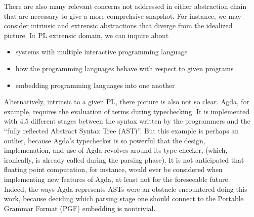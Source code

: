 There are also many relevant concerns not addressed in either abstraction chain
that are necessary to give a more comprehsive snapshot. For instance, we may
consider intrinsic and extrensic abstractions that diverge from the idealized
picture. In PL extrensic domain, we can inquire about 

\begin{itemize}

\item systems with multiple interactive programming language 
\item how the programming languages behave with respect to given programs
\item embedding programming languages into one another

\end{itemize}

Alternatively, intrinsic to a given PL, there picture is also not so clear.
Agda, for example, requires the evaluation of terms during typechecking. It is
implemented with 4.5 different stages between the syntax written by the
programmers and the ``fully reflected Abstract Syntax Tree (AST)''. But this
example is perhaps an outlier, because Agda's typechecker is so powerful that
the design, implemenation, and use of Agda revolves around its type-checker,
(which, ironically, is already called during the parsing phase). It is not
anticipated that floating point computation, for instance, would ever be
considered when implementing new features of Agda, at least not for the
foreseeable future. Indeed, the ways Agda represents ASTs were an obstacle
encountered doing this work, because deciding which parsing stage one should connect
to the Portable Grammar Format (PGF) embedding is nontrivial.



